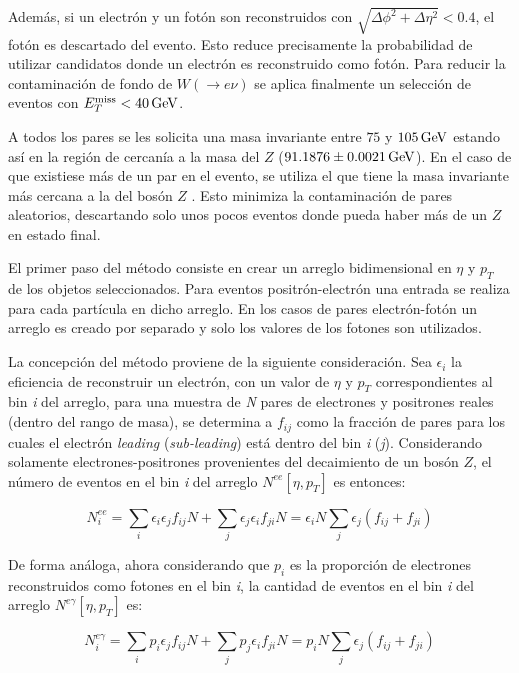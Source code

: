 Además, si un electrón y un fotón son reconstruidos con $\sqrt{\Delta\phi^{2}+\Delta\eta^{2}}<0.4$, el fotón es descartado del evento. Esto reduce precisamente la probabilidad de utilizar candidatos donde un electrón es reconstruido como fotón. Para reducir la contaminación de fondo de $W (\rightarrow e\nu)$ se aplica finalmente un selección de eventos con $E_{T}^{\text{miss}} < 40 \, \mathrm{GeV}$. 


A todos los pares se les solicita una masa invariante entre $75$ y $105 \, \mathrm{GeV}$  estando así en la región de cercanía a la masa del $Z$ ($91.1876 \pm 0.0021 \, \mathrm{GeV}$\cite{Olive:2016xmw}). En el caso de que existiese más de un par en el evento, se utiliza el que tiene la masa invariante más cercana a la del bosón $Z$ . Esto minimiza la contaminación de pares aleatorios, descartando solo unos pocos eventos donde pueda haber más de un $Z$ en estado final.


El primer paso del método consiste en crear un arreglo bidimensional en $\eta$ y $p_{T}$ de los objetos seleccionados. Para eventos positrón-electrón una entrada se realiza para cada partícula en dicho arreglo. En los casos de pares electrón-fotón un arreglo es creado por separado y solo los valores de los fotones son utilizados. 

La concepción del método proviene de la siguiente consideración. Sea $\epsilon_{i}$ la eficiencia de reconstruir un electrón, con un valor de $\eta$ y $p_{T}$ correspondientes al bin \textit{i} del arreglo, para una muestra de \textit{N} pares de electrones y positrones reales (dentro del rango de masa), se determina a $f_{ij}$ como la fracción de pares para los cuales el electrón \textit{leading} (\textit{sub-leading}) está dentro del bin \textit{i} (\textit{j}). Considerando solamente electrones-positrones provenientes del decaimiento de un bosón $Z$, el número de eventos en el bin \textit{i} del arreglo $N^{ee}[\eta , p_{T}]$ es entonces:

\begin{equation}
N_{i}^{ee} = \sum_{i}\epsilon_{i}\epsilon_{j}f_{ij}N + \sum_{j}\epsilon_{j}\epsilon_{i}f_{ji}N = \epsilon_{i}N\sum_{j}\epsilon_{j}(f_{ij}+f_{ji})
\end{equation}

De forma análoga, ahora considerando que $p_{i}$ es la proporción de electrones reconstruidos como fotones en el bin \textit{i}, la cantidad de eventos en el bin \textit{i} del arreglo $N^{e\gamma}[\eta , p_{T}]$ es:

\begin{equation}
N_{i}^{e\gamma} = \sum_{i}p_{i}\epsilon_{j}f_{ij}N + \sum_{j}p_{j}\epsilon_{i}f_{ji}N = p_{i}N\sum_{j}\epsilon_{j}(f_{ij}+f_{ji})
\end{equation}

